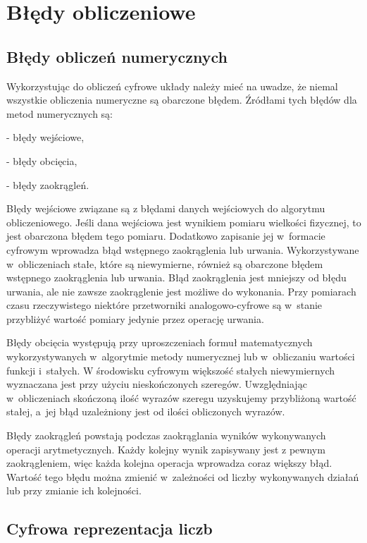 \section{Błędy obliczeniowe}\label{sec:errors}

\subsection{Błędy obliczeń numerycznych}\label{sec:numerr}

Wykorzystując do obliczeń cyfrowe układy należy mieć na uwadze, że niemal wszystkie obliczenia numeryczne są obarczone błędem. Źródłami tych błędów dla metod numerycznych są:

- błędy wejściowe,

- błędy obcięcia,

- błędy zaokrągleń.

Błędy wejściowe związane są z błędami danych wejściowych do algorytmu obliczeniowego. Jeśli dana wejściowa jest wynikiem pomiaru wielkości fizycznej, to jest obarczona błędem tego pomiaru. Dodatkowo zapisanie jej w~formacie cyfrowym wprowadza błąd wstępnego zaokrąglenia lub urwania. Wykorzystywane w~obliczeniach stałe, które są niewymierne, również są obarczone błędem wstępnego zaokrąglenia lub urwania. Błąd zaokrąglenia jest mniejszy od błędu urwania, ale nie zawsze zaokrąglenie jest możliwe do wykonania. Przy pomiarach czasu rzeczywistego niektóre przetworniki analogowo-cyfrowe są w~stanie przybliżyć wartość pomiary jedynie przez operację urwania.

Błędy obcięcia występują przy uproszczeniach formuł matematycznych wykorzystywanych w~algorytmie metody numerycznej lub w~obliczaniu wartości funkcji i~stałych. W środowisku cyfrowym większość stałych niewymiernych wyznaczana jest przy użyciu nieskończonych szeregów. Uwzględniając w~obliczeniach skończoną ilość wyrazów szeregu uzyskujemy przybliżoną wartość stałej, a~jej błąd uzależniony jest od ilości obliczonych wyrazów.

Błędy zaokrągleń powstają podczas zaokrąglania wyników wykonywanych operacji arytmetycznych. Każdy kolejny wynik zapisywany jest z pewnym zaokrągleniem, więc każda kolejna operacja wprowadza coraz większy błąd. Wartość tego błędu można zmienić w~zależności od liczby wykonywanych działań lub przy zmianie ich kolejności.

\subsection{Cyfrowa reprezentacja liczb}\label{sec:numera}

